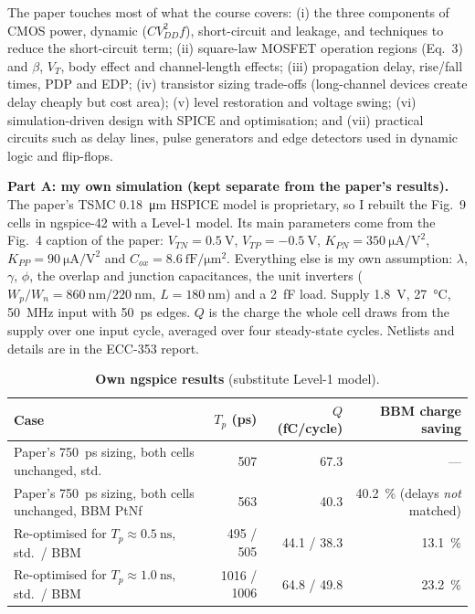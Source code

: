\documentclass[11pt,a4paper]{article}
\begin{document}
The paper touches most of what the course covers: (i) the three components of CMOS power, dynamic ($CV_{DD}^2f$), short-circuit and leakage, and techniques to reduce the short-circuit term; (ii) square-law MOSFET operation regions (Eq.~3) and $\beta$, $V_T$, body effect and channel-length effects; (iii) propagation delay, rise/fall times, PDP and EDP; (iv) transistor sizing trade-offs (long-channel devices create delay cheaply but cost area); (v) level restoration and voltage swing; (vi) simulation-driven design with SPICE and optimisation; and (vii) practical circuits such as delay lines, pulse generators and edge detectors used in dynamic logic and flip-flops.

\textbf{Part A: my own simulation (kept separate from the paper's results).} The paper's TSMC \SI{0.18}{\micro\meter} HSPICE model is proprietary, so I rebuilt the Fig.~9 cells in ngspice-42 with a Level-1 model. Its main parameters come from the Fig.~4 caption of the paper: $V_{TN}=\SI{0.5}{\volt}$, $V_{TP}=\SI{-0.5}{\volt}$, $K_{PN}=\SI{350}{\micro\ampere\per\volt\squared}$, $K_{PP}=\SI{90}{\micro\ampere\per\volt\squared}$ and $C_{ox}=\SI{8.6}{\femto\farad\per\micro\meter\squared}$. Everything else is my own assumption: $\lambda$, $\gamma$, $\phi$, the overlap and junction capacitances, the unit inverters ($W_p/W_n=\SI{860}{\nano\meter}/\SI{220}{\nano\meter}$, $L=\SI{180}{\nano\meter}$) and a \SI{2}{\femto\farad} load. Supply \SI{1.8}{\volt}, \SI{27}{\celsius}, \SI{50}{\mega\hertz} input with \SI{50}{\pico\second} edges. $Q$ is the charge the whole cell draws from the supply over one input cycle, averaged over four steady-state cycles. Netlists and details are in the ECC-353 report.

\begin{table}[H]
  \centering\small
  \caption*{\textbf{Own ngspice results} (substitute Level-1 model).}
  \begin{tabular}{@{}p{7.2cm} r r r@{}}
    \toprule
    Case & $T_p$ (ps) & $Q$ (fC/cycle) & BBM charge saving\\
    \midrule
    Paper's \SI{750}{\pico\second} sizing, both cells unchanged, std.\ & 507 & 67.3 & ---\\
    Paper's \SI{750}{\pico\second} sizing, both cells unchanged, BBM PtNf & 563 & 40.3 & \SI{40.2}{\percent} (delays \emph{not} matched)\\
    Re-optimised for $T_p\approx\SI{0.5}{\nano\second}$, std.\ / BBM & 495 / 505 & 44.1 / 38.3 & \SI{13.1}{\percent}\\
    Re-optimised for $T_p\approx\SI{1.0}{\nano\second}$, std.\ / BBM & 1016 / 1006 & 64.8 / 49.8 & \SI{23.2}{\percent}\\
    \bottomrule
  \end{tabular}
\end{table}
\end{document}
